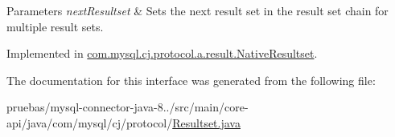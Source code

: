 \begin{DoxyParams}{Parameters}
{\em next\+Resultset} & Sets the next result set in the result set chain for multiple result sets. \\
\hline
\end{DoxyParams}


Implemented in \mbox{\hyperlink{classcom_1_1mysql_1_1cj_1_1protocol_1_1a_1_1result_1_1_native_resultset_a69d6943f5f8f3e38a159e89897c583b2}{com.\+mysql.\+cj.\+protocol.\+a.\+result.\+Native\+Resultset}}.



The documentation for this interface was generated from the following file\+:\begin{DoxyCompactItemize}
\item 
pruebas/mysql-\/connector-\/java-\/8../src/main/core-\/api/java/com/mysql/cj/protocol/\mbox{\hyperlink{_resultset_8java}{Resultset.\+java}}\end{DoxyCompactItemize}
